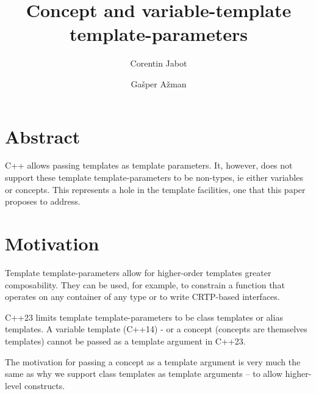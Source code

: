 \documentclass{wg21}
\title{Concept and variable-template template-parameters}
\author{Corentin Jabot}{corentin.jabot@gmail.com}
\author{Gašper Ažman}{gasper.azman@gmail.com}
\begin{document}
\maketitle

\section{Abstract}

C++ allows passing templates as template parameters.
It, however, does not support these template template-parameters to be non-types, ie either variables or concepts.
This represents a hole in the template facilities, one that this paper proposes to address.

\section{Motivation}

Template template-parameters allow for higher-order templates greater composability.
They can be used, for example, to constrain a function that operates on any container of any type or to write CRTP-based interfaces.

C++23 limits template template-parameters to be class templates or alias templates.
A variable template (C++14) - or a concept (concepts are themselves templates) cannot be passed as a template argument in C++23.

The motivation for passing a concept as a template argument is very much the same as why we support class templates as template arguments -- to allow higher-level constructs.
\end{document}

